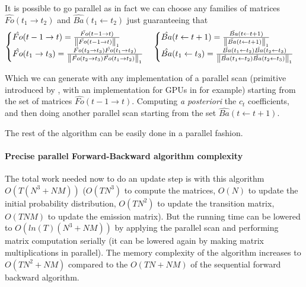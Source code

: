 It is possible to go parallel as in fact we can choose any families of matrices $\hat{Fo}(t_1 \rightarrow t_2)$ and $\hat{Ba}(t_1 \leftarrow t_2)$ just guaranteeing that
\begin{equation}
\begin{cases}
\hat{Fo}( t - 1 \rightarrow t) = \frac{\bar{Fo}( t - 1 \rightarrow t)}{\left\lVert\bar{Fo}( t - 1 \rightarrow t)\right\rVert_1} & \\
\hat{Fo}( t_1 \rightarrow t_3) =   \frac{\hat{Fo}( t_2 \rightarrow t_3) \hat{Fo}( t_1 \rightarrow t_2)}{\left\lVert\hat{Fo}( t_2 \rightarrow t_3) \hat{Fo}( t_1 \rightarrow t_2)\right\rVert_1}& \\
\end{cases}
\begin{cases}
\hat{Ba}(t \leftarrow t+1) = \frac{\bar{Ba}(t \leftarrow t+1)}{\left\lVert\bar{Ba}(t \leftarrow t+1)\right\rVert_1} & \\
\hat{Ba}(t_1 \leftarrow t_3) = \frac{\hat{Ba}(t_1 \leftarrow t_2) \hat{Ba}(t_2 \leftarrow t_3)}{\left\lVert\hat{Ba}(t_1 \leftarrow t_2) \hat{Ba}(t_2 \leftarrow t_3)\right\rVert_1} & \\
\end{cases}
\end{equation}

Which we can generate with any implementation of a parallel scan (primitive introduced by \cite{blelloch1990prefix}, with an implementation for GPUs in \cite{sengupta2008efficient} for example) starting from the set of matrices $\hat{Fo}( t - 1 \rightarrow t)$. Computing \emph{a posteriori} the $c_t$ coefficients, and then doing another parallel scan starting from the set $\hat{Ba}(t \leftarrow t+1)$.

The rest of the algorithm can be easily done in a parallel fashion.

\paragraph{Precise parallel Forward-Backward algorithm complexity}
The total work needed now to do an update step is with this algorithm $O(T(N^3 + NM))$ ($O(TN^3)$ to compute the matrices, $O(N)$ to update the initial probability distribution, $O(TN^2)$ to update the transition matrix, $O(TNM)$ to update the emission matrix). But the running time can be lowered to $O(ln(T)(N^3 + NM))$ by applying the parallel scan and performing matrix computation serially (it can be lowered again by making matrix multiplications in parallel).
The memory complexity of the algorithm increases to $O(TN^2 + NM)$ compared to the $O(TN + NM)$ of the sequential forward backward algorithm.

